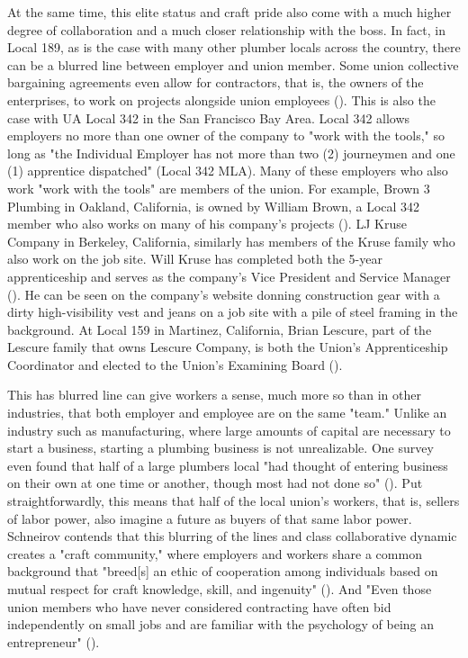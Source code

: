 \documentclass[12pt]{article}
\begin{document}
At the same time, this elite status and craft pride also come with a much higher degree of collaboration and a much closer relationship with the boss. In fact, in Local 189, as is the case with many other plumber locals across the country, there can be a blurred line between employer and union member. Some union collective bargaining agreements even allow for contractors, that is, the owners of the enterprises, to work on projects alongside union employees (\cite[5]{schneirovPrideSolidarityHistory1993}). This is also the case with UA Local 342 in the San Francisco Bay Area. Local 342 allows employers no more than one owner of the company to "work with the tools," so long as "the Individual Employer has not more than two (2) journeymen and one (1) apprentice dispatched" (Local 342 MLA). Many of these employers who also work "work with the tools" are members of the union. For example, Brown 3 Plumbing in Oakland, California, is owned by William Brown, a Local 342 member who also works on many of his company’s projects (\cite{brownplumbingExecutiveSummary}). LJ Kruse Company in Berkeley, California, similarly has members of the Kruse family who also work on the job site. Will Kruse has completed both the 5-year apprenticeship and serves as the company’s Vice President and Service Manager (\cite{ljkruseUs}). He can be seen on the company’s website donning construction gear with a dirty high-visibility vest and jeans on a job site with a pile of steel framing in the background. At Local 159 in Martinez, California, Brian Lescure, part of the Lescure family that owns Lescure Company, is both the Union’s Apprenticeship Coordinator and elected to the Union’s Examining Board (\cite{lescureLinkedIn}).

This has blurred line can give workers a sense, much more so than in other industries, that both employer and employee are on the same "team." Unlike an industry such as manufacturing, where large amounts of capital are necessary to start a business, starting a plumbing business is not unrealizable. One survey even found that half of a large plumbers local "had thought of entering business on their own at one time or another, though most had not done so" (\cite[5]{schneirovPrideSolidarityHistory1993}). Put straightforwardly, this means that half of the local union’s workers, that is, sellers of labor power, also imagine a future as buyers of that same labor power. Schneirov contends that this blurring of the lines and class collaborative dynamic creates a "craft community," where employers and workers share a common background that "breed[s] an ethic of cooperation among individuals based on mutual respect for craft knowledge, skill, and ingenuity" (\cite[6]{schneirovPrideSolidarityHistory1993}). And "Even those union members who have never considered contracting have often bid independently on small jobs and are familiar with the psychology of being an entrepreneur" (\cite[5--6]{schneirovPrideSolidarityHistory1993}). 
\end{document}
